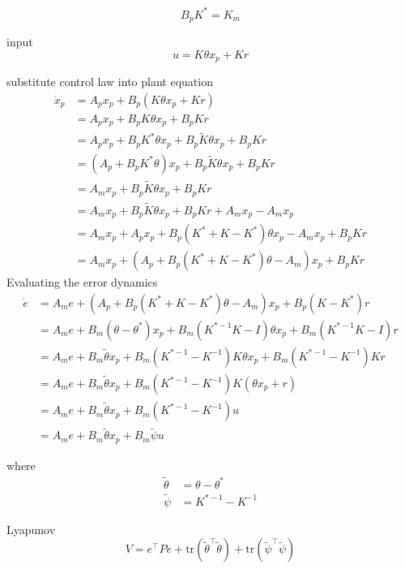 \begin{equation*}
  B_{p}K^{*}=K_{m}
\end{equation*}

input
\begin{equation*}
  u=K\theta x_{p}+Kr
\end{equation*}

substitute control law into plant equation
\begin{align*}
  \dot{x}_{p}&=A_{p}x_{p}+B_{p}(K\theta x_{p}+Kr) \\
  &=A_{p}x_{p}+B_{p}K\theta x_{p}+B_{p}Kr \\
  &=A_{p}x_{p}+B_{p}K^{*}\theta x_{p}+B_{p}\tilde{K}\theta x_{p}+B_{p}Kr \\
  &=(A_{p}+B_{p}K^{*}\theta)x_{p}+B_{p}\tilde{K}\theta x_{p}+B_{p}Kr \\
  &=A_{m}x_{p}+B_{p}\tilde{K}\theta x_{p}+B_{p}Kr \\
  &=A_{m}x_{p}+B_{p}\tilde{K}\theta x_{p}+B_{p}Kr+A_{m}x_{p}-A_{m}x_{p} \\
  &=A_{m}x_{p}+A_{p}x_{p}+B_{p}(K^{*}+K-K^{*})\theta x_{p}-A_{m}x_{p}+B_{p}Kr \\
  &=A_{m}x_{p}+\left(A_{p}+B_{p}(K^{*}+K-K^{*})\theta-A_{m}\right)x_{p}+B_{p}Kr
\end{align*}
Evaluating the error dynamics
\begin{align*}
  \dot{e}&=A_{m}e+\left(A_{p}+B_{p}(K^{*}+K-K^{*})\theta-A_{m}\right)x_{p}+B_{p}(K-K^{*})r \\
  &=A_{m}e+B_{m}(\theta-\theta^{*})x_{p}+B_{m}(K^{*-1}K-I)\theta x_{p}+B_{m}(K^{*-1}K-I)r \\
  &=A_{m}e+B_{m}\tilde{\theta}x_{p}+B_{m}(K^{*-1}-K^{-1})K\theta x_{p}+B_{m}(K^{*-1}-K^{-1})Kr \\
  &=A_{m}e+B_{m}\tilde{\theta}x_{p}+B_{m}(K^{*-1}-K^{-1})K(\theta x_{p}+r) \\
  &=A_{m}e+B_{m}\tilde{\theta}x_{p}+B_{m}(K^{*-1}-K^{-1})u \\
  &=A_{m}e+B_{m}\tilde{\theta}x_{p}+B_{m}\tilde{\psi}u
\end{align*}

where
\begin{align*}
  \tilde{\theta}&=\theta-\theta^{*} \\
  \tilde{\psi}&=K^{*-1}-K^{-1}
\end{align*}

Lyapunov
\begin{equation*}
  V=e^{\top}Pe+\text{tr}\left(\tilde{\theta}^{\top}\tilde{\theta}\right)+\text{tr}\left(\tilde{\psi}^{\top}\tilde{\psi}\right)
\end{equation*}

